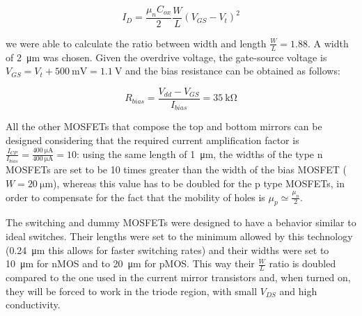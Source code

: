 \documentclass[lettersize,journal]{IEEEtran}
\begin{document}
\begin{equation}\label{eq:long_channel_current}
    I_D = \frac{\mu_nC_{ox}}{2}\frac{W}{L}\left(V_{GS}-V_{t}\right)^2
\end{equation}

we were able to calculate the ratio between width and length \(\frac{W}{L}=1.88\). A width of \qty{2}{\micro\meter} was chosen. Given the overdrive voltage, the gate-source voltage is \(V_{GS}=V_{t}+\qty{500}{\milli\volt}=\qty{1.1}{\volt}\) and the bias resistance can be obtained as follows:

\begin{equation}\label{eq:r_bias}
    R_{bias}=\frac{V_{dd}-V_{GS}}{I_{bias}}=\qty{35}{\kilo\ohm}
\end{equation}

All the other MOSFETs that compose the top and bottom mirrors can be designed considering that the required current amplification factor is \(\frac{I_{CP}}{I_{bias}}=\frac{\qty{400}{\micro\ampere}}{\qty{400}{\micro\ampere}}=10\): using the same length of \qty{1}{\micro\meter}, the widths of the type n MOSFETs are set to be 10 times greater than the width of the bias MOSFET (\(W=\qty{20}{\micro\meter}\)), whereas this value has to be doubled for the p type MOSFETs, in order to compensate for the fact that the mobility of holes is \(\mu_p\simeq\frac{\mu_n}{2}\).

The switching and dummy MOSFETs were designed to have a behavior similar to ideal switches. Their lengths were set to the minimum allowed by this technology (\qty{0.24}{\micro\meter} this allows for faster switching rates) and their widths were set to \qty{10}{\micro\meter} for nMOS and to \qty{20}{\micro\meter} for pMOS. This way their \(\frac{W}{L}\) ratio is doubled compared to the one used in the current mirror transistors and, when turned on, they will be forced to work in the triode region, with small \(V_{DS}\) and high conductivity.
\end{document}
